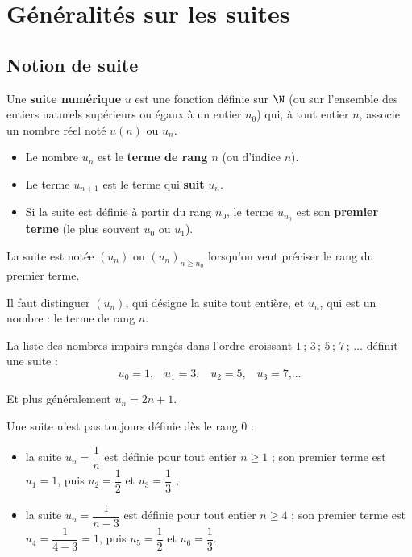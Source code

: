 \chapter{Généralités sur les suites}

\section{Notion de suite}

\begin{defin}
	Une \textbf{suite numérique} $u$ est une fonction définie sur $\N$ (ou sur l'ensemble des entiers naturels supérieurs ou égaux à un entier $n_0$) qui, à tout entier $n$, associe un nombre réel noté $u(n)$ ou $u_n$.
	\begin{itemize}
		\item Le nombre $u_n$ est le \textbf{terme de rang $n$} (ou d'indice $n$).
		\item Le terme $u_{n+1}$ est le terme qui \textbf{suit} $u_n$.
		\item Si la suite est définie à partir du rang $n_0$, le terme $u_{n_0}$ est son \textbf{premier terme} (le plus souvent $u_0$ ou $u_1$).
	\end{itemize}
\end{defin}

\begin{notation}
	La suite est notée $(u_n)$ ou $(u_n)_{n \geq n_0}$ lorsqu'on veut préciser le rang du premier terme.

	Il faut distinguer $(u_n)$, qui désigne la suite tout entière, et $u_n$, qui est un nombre : le terme de rang $n$.
\end{notation}

\begin{ex}
	La liste des nombres impairs rangés dans l'ordre croissant $1\,;\,3\,;\,5\,;\,7\,;\,\dots$ définit une suite :
	\[
		u_0 = 1\text{,}\quad u_1 = 3\text{,}\quad u_2 = 5\text{,}\quad u_3 = 7\text{,}\ldots
	\]

	Et plus généralement $u_n = 2n + 1$.
\end{ex}

\begin{ex}
	Une suite n'est pas toujours définie dès le rang $0$ :
	\begin{itemize}
		\item la suite $u_n = \dfrac{1}{n}$ est définie pour tout entier $n \geq 1$ ; son premier terme est $u_1 = 1$, puis $u_2 = \dfrac{1}{2}$ et $u_3 = \dfrac{1}{3}$ ;
		\item la suite $u_n = \dfrac{1}{n - 3}$ est définie pour tout entier $n \geq 4$ ; son premier terme est $u_4 = \dfrac{1}{4 - 3} = 1$, puis $u_5 = \dfrac{1}{2}$ et $u_6 = \dfrac{1}{3}$.
	\end{itemize}
\end{ex}

